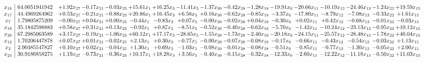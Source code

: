 \documentclass[9pt]{article}
\begin{document}
 \[\begin{array}{c| c c@{\hskip 2pt} c@{\hskip 2pt} c@{\hskip 2pt} c@{\hskip 2pt} c@{\hskip 2pt} c@{\hskip 2pt} c@{\hskip 2pt} c@{\hskip 2pt} c@{\hskip 2pt} c@{\hskip 2pt} c@{\hskip 2pt} c@{\hskip 2pt} c@{\hskip 2pt} c@{\hskip 2pt} c@{\hskip 2pt} }
 x_{16}   &  64.0051941942 & +  1.92 x_{27} & -0.17 x_{21} & -0.03 x_{25} & + 15.61 x_{1} & + 16.25 x_{3} & -11.41 x_{5} & -1.37 x_{30} & -0.42 x_{28} & -1.28 x_{18} & -19.91 x_{6} & -20.66 x_{11} & -10.19 x_{12} & -24.46 x_{13} & -1.24 x_{22} & + 19.59 x_{15}\\
 x_{17}   &  44.4969264962 & +  0.53 x_{27} & -0.21 x_{21} & -0.88 x_{25} & + 20.86 x_{1} & + 16.45 x_{3} & +  6.58 x_{5} & +  0.16 x_{30} & -0.62 x_{28} & -0.85 x_{18} & -3.37 x_{6} & -17.80 x_{11} & -8.79 x_{12} & -7.08 x_{13} & -0.33 x_{22} & +  1.61 x_{15}\\
 x_{7}   &  1.79805875209 & -0.00 x_{27} & +  0.04 x_{21} & +  0.00 x_{25} & -0.44 x_{1} & -0.83 x_{3} & +  0.07 x_{5} & -0.00 x_{30} & -0.02 x_{28} & +  0.04 x_{18} & -0.30 x_{6} & +  0.02 x_{11} & +  0.42 x_{12} & -0.68 x_{13} & -0.01 x_{22} & -0.03 x_{15}\\
 x_{19}   &  35.1842598883 & +  0.58 x_{27} & +  0.31 x_{21} & +  0.13 x_{25} & -0.92 x_{1} & +  0.87 x_{3} & -8.51 x_{5} & -0.52 x_{30} & -0.40 x_{28} & -0.62 x_{18} & -5.70 x_{6} & -1.42 x_{11} & -10.24 x_{12} & -23.13 x_{13} & -0.95 x_{22} & + 10.12 x_{15}\\
 x_{20}   &  67.2985063589 & +  3.17 x_{27} & -0.19 x_{21} & -1.06 x_{25} & + 60.12 x_{1} & + 17.17 x_{3} & -28.65 x_{5} & -1.55 x_{30} & -1.73 x_{28} & -2.40 x_{18} & -20.18 x_{6} & -24.15 x_{11} & -25.57 x_{12} & -28.48 x_{13} & -1.78 x_{22} & + 40.04 x_{15}\\
 x_{14}   &  1.70206447878 & +  0.07 x_{27} & +  0.01 x_{21} & -0.02 x_{25} & +  2.13 x_{1} & +  0.30 x_{3} & -0.77 x_{5} & -0.00 x_{30} & -0.07 x_{28} & -0.08 x_{18} & -0.17 x_{6} & -0.66 x_{11} & -0.43 x_{12} & -0.54 x_{13} & -0.03 x_{22} & +  1.13 x_{15}\\
 x_{2}   &  2.90485547827 & +  0.10 x_{27} & +  0.02 x_{21} & -0.04 x_{25} & +  1.30 x_{1} & +  0.69 x_{3} & -1.03 x_{5} & -0.08 x_{30} & -0.01 x_{28} & -0.08 x_{18} & -0.51 x_{6} & -0.85 x_{11} & -0.77 x_{12} & -1.30 x_{13} & -0.05 x_{22} & +  2.00 x_{15}\\
 x_{23}   &  30.9186858275 & +  1.19 x_{27} & -0.73 x_{21} & -0.36 x_{25} & + 10.17 x_{1} & + 18.28 x_{3} & +  3.56 x_{5} & -0.40 x_{30} & -0.15 x_{28} & -0.32 x_{18} & -12.33 x_{6} & -2.60 x_{11} & -12.22 x_{12} & -11.18 x_{13} & -0.50 x_{22} & + 11.03 x_{15}\\

\end{array}\]
\end{document}
